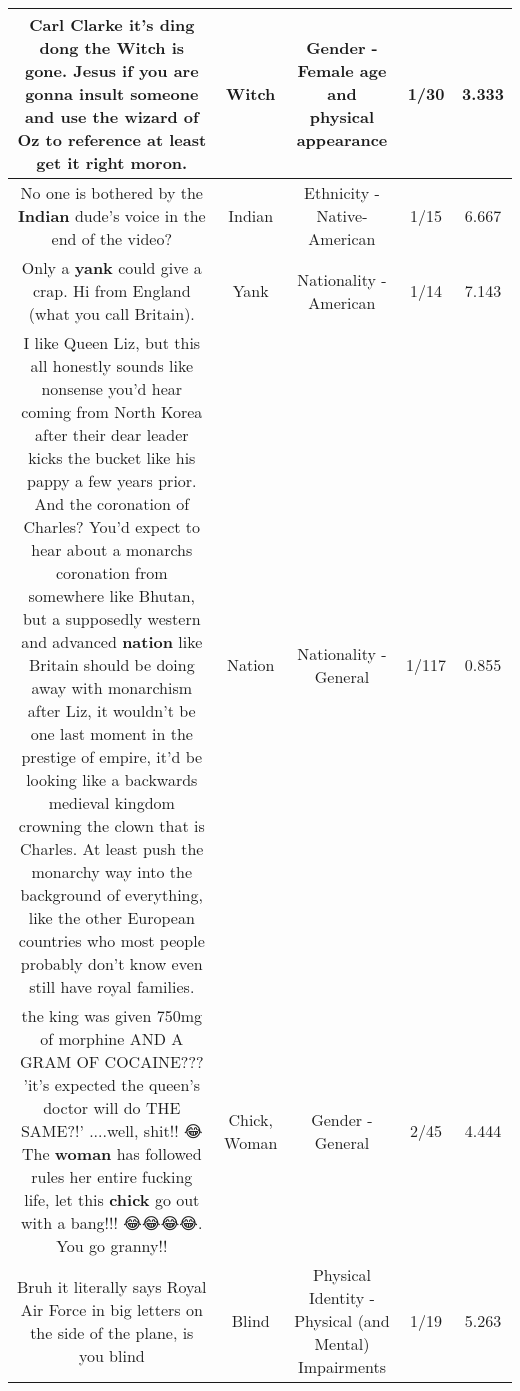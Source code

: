 \documentclass[11pt]{article}
\newlength\mylength
\begin{document}
\begin{center}
\begin{longtable}{|C{.65\mylength}|C{.30\mylength}|C{.12\mylength}|C{.12\mylength}|C{.12\mylength}|}
  \small Carl Clarke it's ding dong the \textbf{Witch} is gone. Jesus if you are gonna insult someone and use the wizard of Oz to reference at least get it right moron.\normalsize   & Witch & Gender - Female age and physical appearance & 1/30 & 3.333 \\  \hline
  \small No one is bothered by the \textbf{Indian} dude's voice in the end of the video?\normalsize   & Indian & Ethnicity - Native-American & 1/15 & 6.667 \\  \hline
  \small Only a \textbf{yank} could give a crap. Hi from England (what you call Britain).\normalsize   & Yank & Nationality - American & 1/14 & 7.143 \\  \hline
  \small I like Queen Liz, but this all honestly sounds like nonsense you'd hear coming from North Korea after their dear leader kicks the bucket like his pappy a few years prior. And the coronation of Charles? You'd expect to hear about a monarchs coronation from somewhere like Bhutan, but a supposedly western and advanced \textbf{nation} like Britain should be doing away with monarchism after Liz, it wouldn't be one last moment in the prestige of empire, it'd be looking like a backwards medieval kingdom crowning the clown that is Charles. At least push the monarchy way into the background of everything, like the other European countries who most people probably don't know even still have royal families.\normalsize   & Nation & Nationality - General & 1/117 & 0.855 \\  \hline
  \small the king was given 750mg of morphine AND A GRAM OF COCAINE???  'it's expected the queen's doctor will do THE SAME?!' ....well, shit!! 😂  The \textbf{woman} has followed rules her entire fucking life, let this \textbf{chick} go out with a bang!!! 😂😂😂😂.   You go granny!!\normalsize   & Chick, Woman & Gender - General & 2/45 & 4.444 \\  \hline
  \small Bruh it literally says Royal Air Force in big letters on the side of the plane, is you blind\normalsize   & Blind & Physical Identity - Physical (and Mental) Impairments & 1/19 & 5.263 \\  \hline

\end{longtable}
\end{center}
\end{document}

